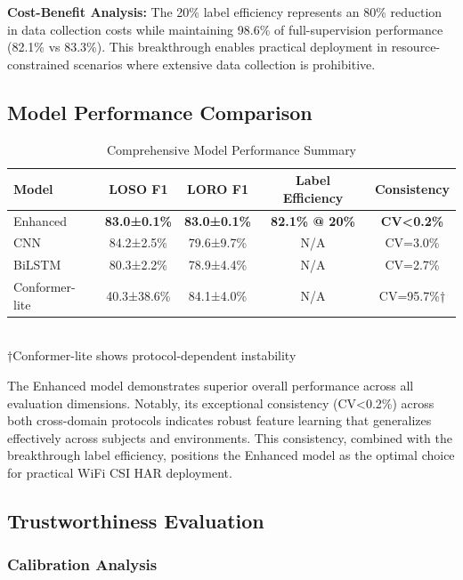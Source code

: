 \documentclass[journal]{IEEEtran}
\begin{document}
\textbf{Cost-Benefit Analysis:} The 20\% label efficiency represents an 80\% reduction in data collection costs while maintaining 98.6\% of full-supervision performance (82.1\% vs 83.3\%). This breakthrough enables practical deployment in resource-constrained scenarios where extensive data collection is prohibitive.

\subsection{Model Performance Comparison}

\begin{table}[ht]
\centering
\caption{Comprehensive Model Performance Summary}
\begin{tabular}{@{}lcccc@{}}
\toprule
Model & LOSO F1 & LORO F1 & Label Efficiency & Consistency \\
\midrule
Enhanced & \textbf{83.0±0.1\%} & \textbf{83.0±0.1\%} & \textbf{82.1\% @ 20\%} & \textbf{CV<0.2\%} \\
CNN & 84.2±2.5\% & 79.6±9.7\% & N/A & CV=3.0\% \\
BiLSTM & 80.3±2.2\% & 78.9±4.4\% & N/A & CV=2.7\% \\
Conformer-lite & 40.3±38.6\% & 84.1±4.0\% & N/A & CV=95.7\%† \\
\bottomrule
\end{tabular}\\
\footnotesize{†Conformer-lite shows protocol-dependent instability}
\label{tab:model_performance}
\end{table}

The Enhanced model demonstrates superior overall performance across all evaluation dimensions. Notably, its exceptional consistency (CV<0.2\%) across both cross-domain protocols indicates robust feature learning that generalizes effectively across subjects and environments. This consistency, combined with the breakthrough label efficiency, positions the Enhanced model as the optimal choice for practical WiFi CSI HAR deployment.

\subsection{Trustworthiness Evaluation}

\subsubsection{Calibration Analysis}
\end{document}
